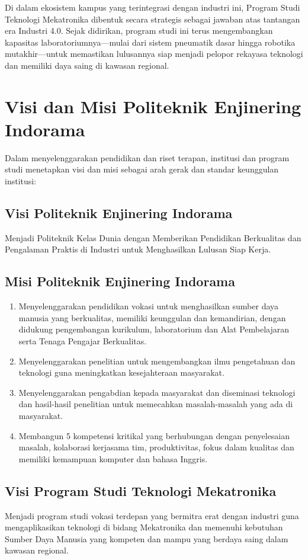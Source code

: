 Di dalam ekosistem kampus yang terintegrasi dengan industri ini, Program Studi Teknologi Mekatronika dibentuk secara strategis sebagai jawaban atas tantangan era Industri 4.0. Sejak didirikan, program studi ini terus mengembangkan kapasitas laboratoriumnya---mulai dari sistem pneumatik dasar hingga robotika mutakhir---untuk memastikan lulusannya siap menjadi pelopor rekayasa teknologi dan memiliki daya saing di kawasan regional.

\section{Visi dan Misi Politeknik Enjinering Indorama}
Dalam menyelenggarakan pendidikan dan riset terapan, institusi dan program studi menetapkan visi dan misi sebagai arah gerak dan standar keunggulan institusi:

\subsection{Visi Politeknik Enjinering Indorama}
Menjadi Politeknik Kelas Dunia dengan Memberikan Pendidikan Berkualitas dan Pengalaman Praktis di Industri untuk Menghasilkan Lulusan Siap Kerja.

\subsection{Misi Politeknik Enjinering Indorama}
\begin{enumerate}[label=\arabic*.]
    \item Menyelenggarakan pendidikan vokasi untuk menghasilkan sumber daya manusia yang berkualitas, memiliki keunggulan dan kemandirian, dengan didukung pengembangan kurikulum, laboratorium dan Alat Pembelajaran serta Tenaga Pengajar Berkualitas.
    \item Menyelenggarakan penelitian untuk mengembangkan ilmu pengetahuan dan teknologi guna meningkatkan kesejahteraan masyarakat.
    \item Menyelenggarakan pengabdian kepada masyarakat dan diseminasi teknologi dan hasil-hasil penelitian untuk memecahkan masalah-masalah yang ada di masyarakat.
    \item Membangun 5 kompetensi kritikal yang berhubungan dengan penyelesaian masalah, kolaborasi kerjasama tim, produktivitas, fokus dalam kualitas dan memiliki kemampuan komputer dan bahasa Inggris.
\end{enumerate}

\subsection{Visi Program Studi Teknologi Mekatronika}
Menjadi program studi vokasi terdepan yang bermitra erat dengan industri guna mengaplikasikan teknologi di bidang Mekatronika dan memenuhi kebutuhan Sumber Daya Manusia yang kompeten dan mampu yang berdaya saing dalam kawasan regional.


